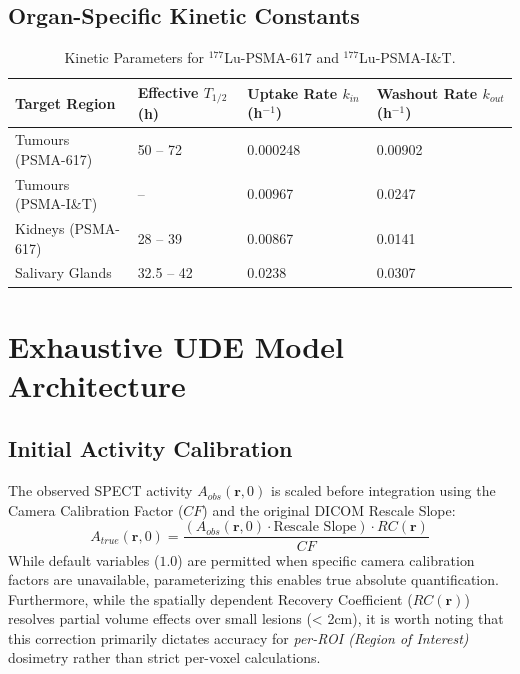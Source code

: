 \documentclass[11pt,a4paper]{article}
\begin{document}
\subsection{Organ-Specific Kinetic Constants}
\begin{table}[h!]
\centering
\caption{Kinetic Parameters for $^{177}$Lu-PSMA-617 and $^{177}$Lu-PSMA-I\&T.}
\begin{tabular}{@{}llll@{}}
\toprule
\textbf{Target Region} & \textbf{Effective $T_{1/2}$ (h)} & \textbf{Uptake Rate $k_{in}$ (h$^{-1}$)} & \textbf{Washout Rate $k_{out}$ (h$^{-1}$)} \\ \midrule
Tumours (PSMA-617) & 50 -- 72 \cite{PetersHofferber2021} & 0.000248 \cite{SiebingaPriv2023} & 0.00902 \cite{SiebingaPriv2023} \\
Tumours (PSMA-I\&T) & -- & 0.00967 \cite{SiebingaVeen2024} & 0.0247 \cite{SiebingaVeen2024} \\
Kidneys (PSMA-617) & 28 -- 39 \cite{PetersHofferber2021} & 0.00867 \cite{SiebingaPriv2023} & 0.0141 \cite{SiebingaPriv2023} \\
Salivary Glands & 32.5 -- 42 \cite{PetersPriv2021} & 0.0238 \cite{SiebingaPriv2023} & 0.0307 \cite{SiebingaPriv2023} \\
\bottomrule
\end{tabular}
\end{table}

\section{Exhaustive UDE Model Architecture}

\subsection{Initial Activity Calibration}
The observed SPECT activity $A_{obs}(\mathbf{r}, 0)$ is scaled before integration using the Camera Calibration Factor ($CF$) and the original DICOM Rescale Slope:
\begin{equation}
    A_{true}(\mathbf{r}, 0) = \frac{\left( A_{obs}(\mathbf{r}, 0) \cdot \text{Rescale Slope} \right) \cdot RC(\mathbf{r})}{CF}
\end{equation}
While default variables ($1.0$) are permitted when specific camera calibration factors are unavailable, parameterizing this enables true absolute quantification. Furthermore, while the spatially dependent Recovery Coefficient ($RC(\mathbf{r})$) resolves partial volume effects over small lesions (< 2cm), it is worth noting that this correction primarily dictates accuracy for \textit{per-ROI (Region of Interest)} dosimetry rather than strict per-voxel calculations.
\end{document}
